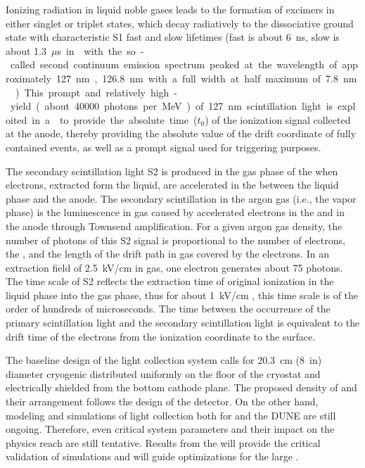 Ionizing radiation in liquid noble gases leads to the formation of excimers in either singlet or triplet states, which decay radiatively to the dissociative ground state with characteristic S1 fast and slow lifetimes (fast is about \SI{6}{ns}, slow is about \SI{1.3}{$\mu$s} in \lar with the so-called second continuum emission spectrum peaked at the wavelength of approximately \SI{127}{nm}, \SI{126.8}{nm} with a full width at half maximum of \SI{7.8}{nm} \cite{Heindl}). This prompt and relatively high-yield (about \num{40000} photons per \si{MeV}) of \SI{127}{nm} scintillation light is exploited in a \lartpc to provide the absolute time ($t_0$) of the ionization signal collected at the anode, thereby providing the absolute value of the drift coordinate of fully contained events, as well as a prompt signal used for triggering purposes.

The secondary scintillation light S2 is produced in the gas phase of the  when electrons, extracted form the liquid, are accelerated in the \efield between the liquid phase and the anode. The secondary scintillation in the argon gas (i.e., the vapor phase) is the luminescence in gas caused by accelerated electrons in the \efield and in the  anode through Townsend amplification. For a given argon gas density, the number of photons of this S2 signal is proportional to the number of electrons, the \efield, and the length of the drift path in gas covered by the electrons. In an extraction field of \SI{2.5}{kV/cm} in gas, one electron generates about \num{75} photons. The time scale of S2 reflects the extraction time of original ionization in the liquid phase into the gas phase, thus for about \SI{1}{kV/cm} \efield, this time scale is of the order of hundreds of microseconds. The time between the occurrence of the primary scintillation light and the secondary scintillation light is equivalent to the drift time of the electrons from the ionization coordinate to the \lar surface.

The baseline design of the light collection system calls for \SI{20.3}{cm} (\SI{8}{in}) diameter cryogenic  distributed uniformly on the floor of the cryostat and electrically shielded from the bottom cathode plane. The proposed density of  and their arrangement follows the design of the  detector. On the other hand, modeling and simulations of light collection both for  and the DUNE  are still ongoing. Therefore, even critical system parameters and their impact on the physics reach are still tentative. Results from the  will provide the critical validation of simulations and will guide optimizations for the large .

